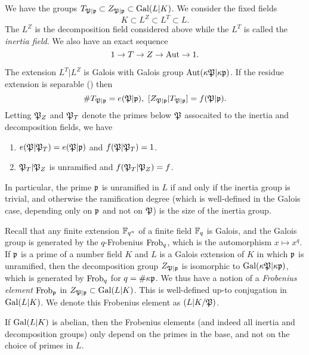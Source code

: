 We have the groups $T_{\mathfrak{P}|\mathfrak{p}} \subset Z_{\mathfrak{P}|\mathfrak{p}} \subset \operatorname{Gal}(L|K)$.
We consider the fixed fields
\[ K \subset L^{Z} \subset L^{T} \subset L. \]
The $L^{Z}$ is the decomposition field considered above while the $L^{T}$ is called the \emph{inertia field}.
We also have an exact sequence
\[ 1 \to T \to Z \to \operatorname{Aut} \to 1. \]

\begin{proposition}
  The extension $L^{T}|L^{Z}$ is Galois with Galois group $\operatorname{Aut}(\kappa\mathfrak{P}|\kappa\mathfrak{p})$.
  If the residue extension is separable () then
  \[ \# T_{\Pfrak|\pfrak} = e(\Pfrak|\pfrak), \ [Z_{\Pfrak|\pfrak}|T_{\Pfrak|\pfrak}] = f(\Pfrak|\pfrak). \]
  Letting $\mathfrak{P}_{Z}$ and $\mathfrak{P}_{T}$ denote the primes below $\mathfrak{P}$ assocaited to the inertia and decomposition fields, we have
  \begin{enumerate}
    \item $e(\mathfrak{P}|\mathfrak{P}_{T}) = e(\mathfrak{P}|\mathfrak{p})$ and $f(\mathfrak{P}|\mathfrak{P}_{T}) = 1$.
    \item $\mathfrak{P}_{T}|\mathfrak{P}_{Z}$ is unramified and $f(\mathfrak{P}_{T}|\mathfrak{P}_{Z}) = f$.
  \end{enumerate}
\end{proposition}

In particular, the prime $\mathfrak{p}$ is unramified in $L$ if and only if the inertia group is trivial, and otherwise the ramification degree (which is well-defined in the Galois case, depending only on $\mathfrak{p}$ and not on $\mathfrak{P}$) is the size of the inertia group.

Recall that any finite extension $\mathbb{F}_{q^{n}}$ of a finite field $\mathbb{F}_{q}$ is Galois, and the Galois group is generated by the $q$-Frobenius $\operatorname{Frob}_{q}$, which is the automorphism $x \mapsto x^{q}$.
If $\mathfrak{p}$ is a prime of a number field $K$ and $L$ is a Galois extension of $K$ in which $\mathfrak{p}$ is unramified, then the decomposition group $Z_{\mathfrak{P}|\mathfrak{p}}$ is isomorphic to $\operatorname{Gal}(\kappa\mathfrak{P}|\kappa\mathfrak{p})$, which is generated by $\operatorname{Frob}_{q}$ for $q = \#\kappa\mathfrak{p}$.
We thus have a notion of a \emph{Frobenius element} $\operatorname{Frob}_{\mathfrak{p}}$ in $Z_{\mathfrak{P}|\mathfrak{p}} \subset \operatorname{Gal}(L|K)$.
This is well-defined up-to conjugation in $\operatorname{Gal}(L|K)$.
We denote this Frobenius element as $(L|K/\mathfrak{P})$.

\begin{remark}
  If $\operatorname{Gal}(L|K)$ is abelian, then the Frobenius elements (and indeed all inertia and decomposition groups) only depend on the primes in the base, and not on the choice of primes in $L$.
\end{remark}

